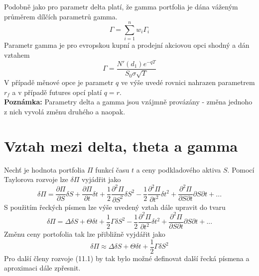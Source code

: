 \documentclass[a4paper]{book}
\begin{document}
Podobně jako pro parametr delta platí, že gamma portfolia je dána váženým průměrem dílčích parametrů gamma.
\begin{equation*}
\Gamma = \sum_{i=1}^{n} w_i \Gamma_i
\end{equation*}
Parametr gamma je pro evropskou kupní a prodejní akciovou opci shodný a dán vztahem
\begin{equation*}
\Gamma = \frac{N'(d_1)e^{-qT}}{S_0 \sigma \sqrt{T}}
\end{equation*}
V případě měnové opce je parametr $q$ ve výše uvedé rovnici nahrazen parametrem $r_f$ a v případě futures opcí platí $q=r$.\\

\noindent \textbf{Poznámka:} Parametry delta a gamma jsou vzájmně provázány - změna jednoho z nich vyvolá změnu druhého a naopak.

\section{Vztah mezi delta, theta a gamma}
Nechť je hodnota portfolia $\Pi$ funkcí času $t$ a ceny podkladového aktiva $S$. Pomocí Taylorova rozvoje lze $\delta \Pi$ vyjádřit jako
\begin{equation*}
\delta \Pi = \frac{\partial \Pi}{\partial S} \delta S + \frac{\partial \Pi}{\partial t}\delta t + \frac{1}{2}\frac{\partial^2 \Pi}{\partial S^2}\delta S^2 -\frac{1}{2}\frac{\partial^2 \Pi}{\partial t^2} \delta t^2 + \frac{\partial^2 \Pi}{\partial S \partial t}\partial S \partial t + ...
\end{equation*}
S použitím řeckých písmen lze výše uvedený vztah dále upravit do tvaru
\begin{equation}
\delta \Pi = \Delta \delta S + \Theta \delta t + \frac{1}{2}\Gamma \delta S^2 - \frac{1}{2}\frac{\partial^2 \Pi}{\partial t^2} \delta t^2 + \frac{\partial^2 \Pi}{\partial S \partial t}\partial S \partial t + ...
\end{equation}
Změnu ceny portofolia tak lze přibližně vyjdářit jako
\begin{equation}
\delta \Pi \approx \Delta \delta S + \Theta \delta t + \frac{1}{2}\Gamma \delta S^2
\end{equation}
Pro další členy rozvoje (11.1) by tak bylo možné definovat další řecká písmena a aproximaci dále zpřesnit.
\end{document}
